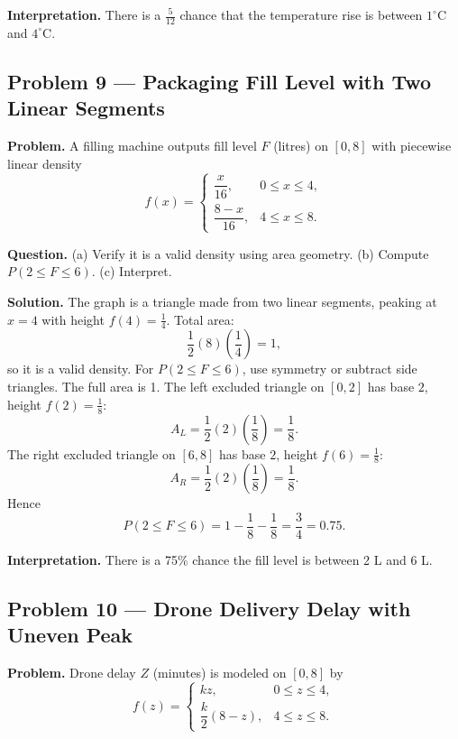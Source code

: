 \begin{ExamProblems}
\textbf{Interpretation.}
There is a $\frac{5}{12}$ chance that the temperature rise is between $1^\circ$C and $4^\circ$C.



\item
\subsection*{Problem 9 — Packaging Fill Level with Two Linear Segments}

\textbf{Problem.}
A filling machine outputs fill level $F$ (litres) on $[0,8]$ with piecewise linear density
\[
f(x)=\begin{cases}
\dfrac{x}{16}, & 0\le x\le 4,\\
\dfrac{8-x}{16}, & 4\le x\le 8.
\end{cases}
\]

\textbf{Question.}
(a) Verify it is a valid density using area geometry. (b) Compute $P(2\le F\le 6)$. (c) Interpret.

\textbf{Solution.}
The graph is a triangle made from two linear segments, peaking at $x=4$ with height $f(4)=\frac14$.
Total area:
\[
\frac12(8)\left(\frac14\right)=1,
\]
so it is a valid density.
For $P(2\le F\le 6)$, use symmetry or subtract side triangles.
The full area is 1. The left excluded triangle on $[0,2]$ has base $2$, height $f(2)=\frac18$:
\[
A_L=\frac12(2)\left(\frac18\right)=\frac18.
\]
The right excluded triangle on $[6,8]$ has base $2$, height $f(6)=\frac18$:
\[
A_R=\frac12(2)\left(\frac18\right)=\frac18.
\]
Hence
\[
P(2\le F\le 6)=1-\frac18-\frac18=\frac34=0.75.
\]

\textbf{Interpretation.}
There is a 75\% chance the fill level is between 2 L and 6 L.


\item
\subsection*{Problem 10 — Drone Delivery Delay with Uneven Peak}

\textbf{Problem.}
Drone delay $Z$ (minutes) is modeled on $[0,8]$ by
\[
f(z)=\begin{cases}
kz, & 0\le z\le 4,\\
\dfrac{k}{2}(8-z), & 4\le z\le 8.
\end{cases}
\]


\end{ExamProblems}
